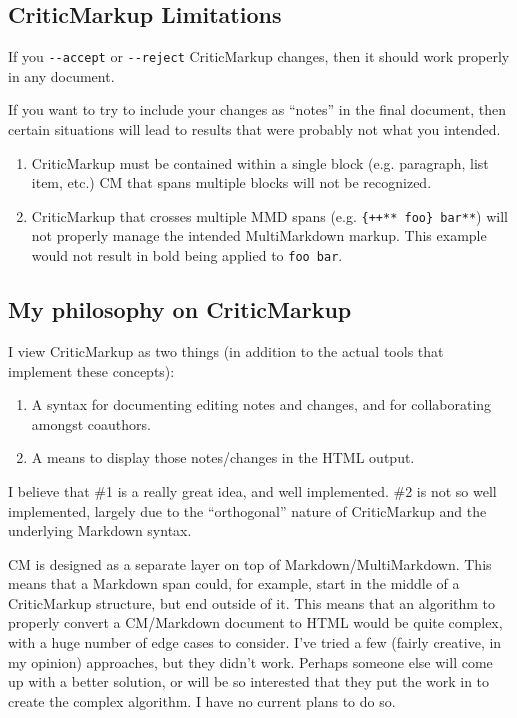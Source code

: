 \subsection{CriticMarkup Limitations}
\label{criticmarkuplimitations}

If you \texttt{-{}-accept} or \texttt{-{}-reject} CriticMarkup changes, then it should work properly in any document.

If you want to try to include your changes as ``notes'' in the final document, then certain situations will lead to results that were probably not what you intended.

\begin{enumerate}
\item CriticMarkup must be contained within a single block (e.g. paragraph, list item, etc.) CM that spans multiple blocks will not be recognized.

\item CriticMarkup that crosses multiple \gls{MMD} spans (e.g. \texttt{\{++** foo\} bar**}) will not properly manage the intended MultiMarkdown markup. This example would not result in bold being applied to \texttt{foo bar}.

\end{enumerate}

\subsection{My philosophy on CriticMarkup}
\label{myphilosophyoncriticmarkup}

I view CriticMarkup as two things (in addition to the actual tools that implement these concepts):

\begin{enumerate}
\item A syntax for documenting editing notes and changes, and for collaborating amongst coauthors.

\item A means to display those notes\slash{}changes in the HTML output.

\end{enumerate}

I believe that \#1 is a really great idea, and well implemented. \#2 is not so well implemented, largely due to the ``orthogonal'' nature of CriticMarkup and the underlying Markdown syntax.

CM is designed as a separate layer on top of Markdown\slash{}MultiMarkdown. This means that a Markdown span could, for example, start in the middle of a CriticMarkup structure, but end outside of it. This means that an algorithm to properly convert a CM\slash{}Markdown document to HTML would be quite complex, with a huge number of edge cases to consider. I've tried a few (fairly creative, in my opinion) approaches, but they didn't work. Perhaps someone else will come up with a better solution, or will be so interested that they put the work in to create the complex algorithm. I have no current plans to do so.

